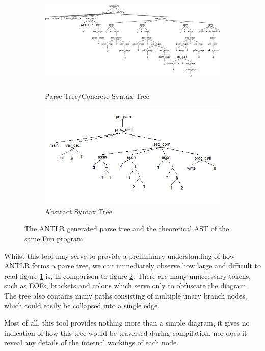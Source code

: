 \documentclass{l4proj}
\begin{document}
\begin{figure}[h]
	\begin{subfigure}[b]{0.5\textwidth}
		\includegraphics[height=5cm,width=\linewidth]{images/2-2a.png}
		\caption{Parse Tree/Concrete Syntax Tree}
		\label{fig:ANTLR-parse-tree}
	\end{subfigure}
	\begin{subfigure}[b]{0.5\textwidth}
		\includegraphics[height=5cm,width=\linewidth]{images/2-2b.png}
		\caption{Abstract Syntax Tree}
		\label{fig:ANTLR-syntax-tree}
	\end{subfigure}
	\caption{The ANTLR generated parse tree and the theoretical AST of the same Fun program}\label{fig:parse-abstract-tree}	
\end{figure}

Whilst this tool may serve to provide a preliminary understanding of how ANTLR forms a parse tree, we can immediately observe how large and difficult to read figure \ref{fig:ANTLR-parse-tree} is, in comparison to figure \ref{fig:ANTLR-syntax-tree}. There are many unnecessary tokens, such as EOFs, brackets and colons which serve only to obfuscate the diagram. The tree also contains many paths consisting of multiple unary branch nodes, which could easily be collapsed into a single edge.

Most of all, this tool provides nothing more than a simple diagram, it gives no indication of how this tree would be traversed during compilation, nor does it reveal any details of the internal workings of each node.
\end{document}
